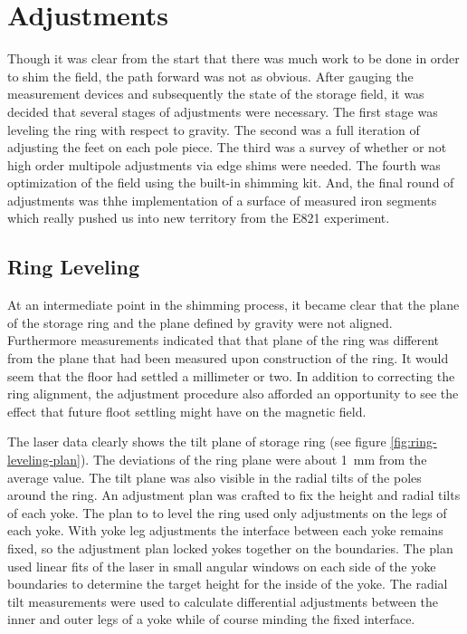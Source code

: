 \section{Adjustments}

Though it was clear from the start that there was much work to be done in order to shim the field, the path forward was not as obvious.  After gauging the measurement devices and subsequently the state of the storage field, it was decided that several stages of adjustments were necessary.  The first stage was leveling the ring with respect to gravity.  The second was a full iteration of adjusting the feet on each pole piece.  The third was a survey of whether or not high order multipole adjustments via edge shims were needed.  The fourth was optimization of the field using the built-in shimming kit.  And, the final round of adjustments was thhe implementation of a surface of measured iron segments which really pushed us into new territory from the E821 experiment.

\subsection{Ring Leveling}
At an intermediate point in the shimming process, it became clear that the plane of the storage ring and the plane defined by gravity were not aligned.  Furthermore measurements indicated that that plane of the ring was different from the plane that had been measured upon construction of the ring.  It would seem that the floor had settled a millimeter or two.  In addition to correcting the ring alignment, the adjustment procedure also afforded an opportunity to see the effect that future floot settling might have on the magnetic field.

The laser data clearly shows the tilt plane of storage ring (see figure \ref{fig:ring-leveling-plan}).  The deviations of the ring plane were about \SI{1}{\milli\meter} from the average value.  The tilt plane was also visible in the radial tilts of the poles around the ring.  An adjustment plan was crafted to fix the height and radial tilts of each yoke.  The plan to to level the ring used only adjustments on the legs of each yoke. With yoke leg adjustments the interface between each yoke remains fixed, so the adjustment plan locked yokes together on the boundaries.  The plan used linear fits of the laser in small angular windows on each side of the yoke boundaries to determine the target height for the inside of the yoke.  The radial tilt measurements were used to calculate differential adjustments between the inner and outer legs of a yoke while of course minding the fixed interface. 

